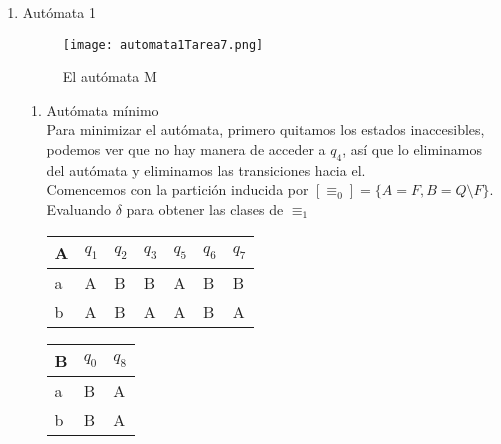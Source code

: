 \documentclass{article}
\begin{document}
    	\begin{enumerate}
    		\item {
    			Autómata 1
    			\begin{figure} [H]
    				\centering
    				\texttt{[image: automata1Tarea7.png]}
    				\caption{El autómata M}
    			\end{figure}
    			 \begin{enumerate}
    				\item {
    				Autómata mínimo\\
                    Para minimizar el autómata, primero quitamos los estados 
                    inaccesibles, podemos ver que no hay manera de acceder a 
                    $q_{4}$, así que lo eliminamos del autómata y eliminamos 
                    las transiciones hacia el.\\
    				
    				Comencemos con la partición inducida por $[\equiv_{0}] = 
    				\{A = F, B = Q \setminus F\}$.\\
    				Evaluando $\delta$ para obtener las clases de $\equiv_{1}$
    				
    				\begin{table}[H]
    					\centering
    					\begin{tabular}{|l|l|l|l|l|l|l|}
    						\hline
    						A & $q_{1}$ & $q_{2}$ & $q_{3}$ & $q_{5}$ & $q_{6}$ & $q_{7}$ \\ \hline
    						a & A       & B       & B       & A       & B       & B       \\ \hline
    						b & A       & B       & A       & A       & B       & A       \\ \hline
    					\end{tabular}
    					\quad
    					\begin{tabular}{|l|l|l|}
    						\hline
    						B &  $q_{0}$ &  $q_{8}$ \\ \hline
    						a &  B &  A       \\ \hline
    						b &  B &  A      \\ \hline
    					\end{tabular}
    				\end{table}
    				
}
\end{enumerate}}
\end{enumerate}
\end{document}
